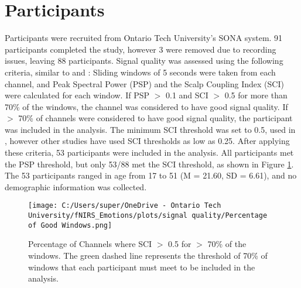\section{Participants}
Participants were recruited from Ontario Tech University's SONA system. 
91 participants completed the study, however 3 were removed due to recording issues, leaving 88 participants.
Signal quality was assessed using the following criteria, similar to \citep{bulgarelli_growth_2025} and \citep{hernandez_nirsplot_2020}: 
Sliding windows of 5 seconds were taken from each channel, and Peak Spectral Power (PSP) and the Scalp Coupling Index (SCI) \citep{pollonini_phoebe_2016} were calculated for each window.
If PSP $>$ 0.1 and SCI $>$ 0.5 for more than 70\% of the windows, the channel was considered to have good signal quality.
If $>$ 70\% of channels were considered to have good signal quality, the participant was included in the analysis.
The minimum SCI threshold was set to 0.5, used in \citep{holmes_opening_2024}, however other studies have used SCI thresholds as low as 0.25\citep{zhou_autistic_2024}. 
After applying these criteria, 53 participants were included in the analysis. 
All participants met the PSP threshold, but only 53/88 met the SCI threshold, as shown in Figure \ref{fig:signal_quality}.
The 53 participants ranged in age from 17 to 51 (M = 21.60, SD = 6.61), and no demographic information was collected. 

\begin{figure}[H]
    \centering
    \texttt{[image: C:/Users/super/OneDrive - Ontario Tech University/fNIRS\_Emotions/plots/signal quality/Percentage of Good Windows.png]}
    \caption{Percentage of Channels where SCI $>$ 0.5 for $>$ 70\% of the windows.
    The green dashed line represents the threshold of 70\% of windows that each participant must meet to be included in the analysis.}
    \label{fig:signal_quality}
\end{figure}

